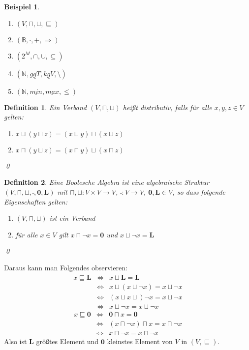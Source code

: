 \documentclass[ngerman]{scrartcl}
\theoremstyle{custom}
\newtheorem{mdef}{Definition} \numberwithin{mdef}{subsection}
\newtheorem*{ex}{Beispiel}
\newcommand{\0}{\mathbf{0}}
\newcommand{\1}{\mathbf{L}}
\begin{document}
\begin{ex}
\begin{enumerate}
\item $(V, \sqcap, \sqcup, \sqsubseteq)$
\item $(\mathds{B}, \cdot, +, \Rightarrow)$
\item $(2^M, \cap, \cup, \subseteq)$
\item $(\mathds{N}, \underline{ggT}, \underline{kgV}, \setminus)$
\item $(\mathds{N}, \underline{min}, \underline{max}, \le)$
\end{enumerate}
\end{ex}

\begin{mdef} Ein Verband $(V, \sqcap, \sqcup)$ hei\ss t distributiv,
  falls f\"ur alle $x, y, z \in V$ gelten:
\begin{enumerate}
\item $x \sqcup (y \sqcap z) = (x \sqcup y) \sqcap (x \sqcup z)$
\item $x \sqcap (y \sqcup z) = (x \sqcap y) \sqcup (x \sqcap z)$
\end{enumerate}
\qed
\end{mdef}

\begin{mdef}
Eine Boolesche Algebra ist eine algebraische Struktur $(V, \sqcap,
\sqcup, \bar~, \mathbf{0}, \mathbf{L})$ mit $\sqcap, \sqcup: V \times V
\rightarrow V$, $\bar~: V \rightarrow V$, $\mathbf{0}, \mathbf{L} \in
V$, so dass folgende Eigenschaften gelten:
\begin{enumerate}
\item $(V, \sqcap, \sqcup)$ ist ein Verband
\item f\"ur alle $x \in V$ gilt $x \sqcap \neg x = \mathbf{0}$ und
  $x \sqcup \neg x = \mathbf{L}$
\end{enumerate}
\qed
\end{mdef}

Daraus kann man Folgendes observieren:
\begin{eqnarray*}
x \sqsubseteq \mathbf{L} &\Leftrightarrow& x \sqcup \mathbf{L} = \mathbf{L} \\
&\Leftrightarrow& x \sqcup (x \sqcup \neg x) = x \sqcup \neg x\\
&\Leftrightarrow& (x \sqcup x \sqcup) \neg x = x \sqcup \neg x\\
&\Leftrightarrow& x \sqcup \neg x = x \sqcup \neg x
\end{eqnarray*}
\begin{eqnarray*}
x \sqsubseteq \mathbf{0} &\Leftrightarrow& \mathbf{0} \sqcap x =
\mathbf{0} \\
&\Leftrightarrow& (x \sqcap \neg x) \sqcap x = x \sqcap \neg x \\
&\Leftrightarrow& x \sqcap \neg x = x \sqcap \neg x
\end{eqnarray*}
Also ist $\mathbf{L}$ gr\"o\ss tes Element und $\mathbf{0}$ kleinstes Element von $V$ in $(V,
\sqsubseteq)$.
\end{document}
